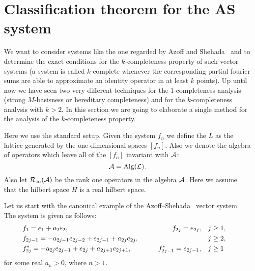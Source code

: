 
  \section{Classification theorem for the AS system}
    We want to consider systems like the one regarded by Azoff and Shehada~\cite{azoff} and to determine the exact conditions for the $k$-completeness property
      of such vector systems (a system is called $k$-complete whenever the corresponding partial fourier sums are able to approximate an identity operator in at least $k$ points). Up until now we have seen two very different techniques for the 
    $1$-completeness analysis (strong $M$-basisness or hereditary completeness) and for the $k$-completeness analysis with $k>2$. 
    In this section we are going to elaborate a single method for the analysis of the $k$-completeness property.
    
    Here we use the standard setup. Given the system $f_n$ we define the $L$ as the lattice generated by the one-dimensional spaces $[f_n]$. Also we denote
    the algebra of operators which leave all of the $[f_n]$ invariant with $\cal{A}$:
    $$\cal{A} = \operatorname{Alg}(L).$$
    Also let $\cal{R}_1(\cal{A})$ be the rank one operators in the algebra $\cal{A}$.
    Here we assume that the hilbert space $H$ is a real hilbert space.
    
    Let us start with the canonical example of the Azoff--Shehada~\cite{azoff} vector system. The system is given as follows:
    \begin{equation}
        \label{as-system}
        \begin{aligned}
          &f_1 = e_1 + a_2 e_2, \qquad &f_{2j}=e_{2j}, \quad&j \geq 1,&\\
          &f_{2j-1}=-a_{2j-1}e_{2j-2} + e_{2j-1} + a_{2j}e_{2j}, \qquad &\makebox[5em]{} \quad&j \geq 2,&\\
          &f^*_{2j}=-a_{2j}e_{2j-1}+e_{2j}+a_{2j+1}e_{2j+1}, \qquad &f^*_{2j-1}=e_{2j-1}, \quad&j \geq 1&
        \end{aligned}
    \end{equation}
    for some real $a_n > 0$, where $n > 1$.
    
